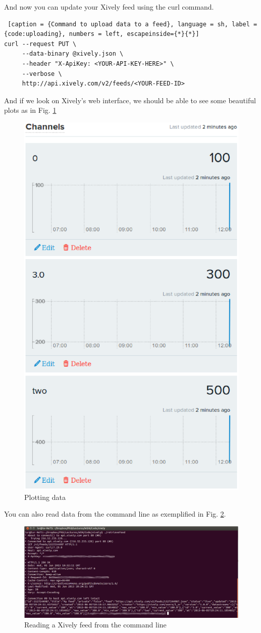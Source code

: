 And now you can update your Xively feed using the curl command.\\

\begin{lstlisting} [caption = {Command to upload data to a feed}, language = sh, label = {code:uploading}, numbers = left, escapeinside={*}{*}]
curl --request PUT \
     --data-binary @xively.json \
     --header "X-ApiKey: <YOUR-API-KEY-HERE>" \
     --verbose \
     http://api.xively.com/v2/feeds/<YOUR-FEED-ID>
\end{lstlisting}

And if we look on Xively's web interface, we should be able to see some beautiful plots as in Fig. \ref{fig:plots}

\begin{figure}[htbp]
  \centering
  \includegraphics[width=0.6\linewidth]{figures/exportToXively.eps}
  \caption{Plotting data}
  \label{fig:plots}
\end{figure}

You can also read data from the command line as exemplified in Fig. \ref{fig:reading-cosm}.

\begin{figure}[htbp]
  \centering
  \includegraphics[width=0.9\linewidth]{figures/retrieveXively.eps}
  \caption{Reading a Xively feed from the command line}
  \label{fig:reading-cosm}
\end{figure}

